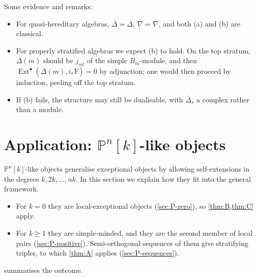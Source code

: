 \documentclass[11pt,reqno]{amsart}
\theoremstyle{plain}
\theoremstyle{definition}
\theoremstyle{remark}
\DeclareMathOperator{\Ext}{Ext}
\newcommand{\Pn}[2]{\mathbb{P}^{#1}[#2]}
\newcommand{\nablabar}{\overline{\nabla}}
\newcommand{\Deltabar}{\overline{\Delta}}
\begin{document}
Some evidence and remarks:
\begin{itemize}
\item For quasi-hereditary algebras, $\Deltabar=\Delta$, $\nablabar=\nabla$, and both (a) and (b) are classical.
\item For properly stratified algebras we expect (b) to hold. On the top stratum, $\Deltabar(m)$ should be $j_{m!}$ of the simple $B_m$-module, and then $\Ext^\bullet(\Deltabar(m),i_*Y)=0$ by adjunction; one would then proceed by induction, peeling off the top stratum.
\item If (b) fails, the structure may still be dualisable, with $\Deltabar_s$ a complex rather than a module.
\end{itemize}

\section{Application: \texorpdfstring{$\mathbb{P}^n[k]$}{Pn[k]}-like objects}\label{sec:P-objects}

$\Pn nk$-like objects generalise exceptional objects by allowing self-extensions in the degrees $k,2k,\dots,nk$. In this section we explain how they fit into the general framework.
\begin{itemize}
\item For $k=0$ they are local-exceptional objects (\cref{sec:P-zero}), so \cref{thm:B,thm:C} apply.
\item For $k\ge1$ they are simple-minded, and they are the second member of local pairs (\cref{sec:P-positive}). Semi-orthogonal sequences of them give stratifying triples, to which \cref{thm:A} applies (\cref{sec:P-sequences}).
\end{itemize}
 summarises the outcome.
\end{document}
